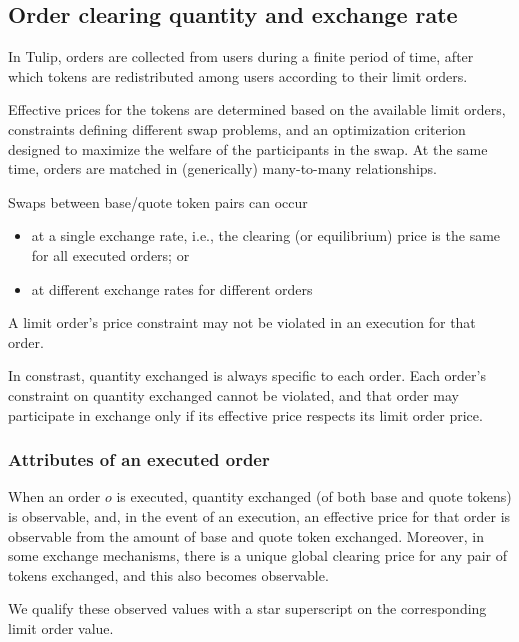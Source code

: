 \documentclass[11pt, reqno]{amsart}
\theoremstyle{definition}
\theoremstyle{remark}
\begin{document}
\subsection{Order clearing quantity and exchange rate}
In Tulip, orders are collected from users during a finite period of time,
after which tokens are redistributed among users according to their limit
orders.

Effective prices for the tokens are determined based on the available limit
orders, constraints defining different swap problems, and an optimization
criterion designed to maximize the welfare of the participants in the swap.
At the same time, orders are matched in (generically) many-to-many relationships.

Swaps between base/quote token pairs can occur
\begin{itemize}
  \item at a single exchange rate, i.e., the
clearing (or equilibrium) price is the same for all executed orders; or
  \item at different exchange rates for different orders
\end{itemize}
A limit order's price constraint may not be violated in an execution for that
order.

In constrast, quantity exchanged is always specific to each order. Each
order's constraint on quantity exchanged cannot be violated, and that order
may participate in exchange only if its effective price respects its limit
order price.

\subsubsection{Attributes of an executed order}
When an order $o$ is executed, quantity exchanged (of both base and quote
tokens) is observable, and, in the event of an execution, an effective
price for that order is observable from the amount of base and quote token
exchanged. Moreover, in some exchange mechanisms, there is a unique global
clearing price for any pair of tokens exchanged, and this also becomes
observable.

We qualify these observed values with a star superscript on the
corresponding limit order value.
\end{document}

